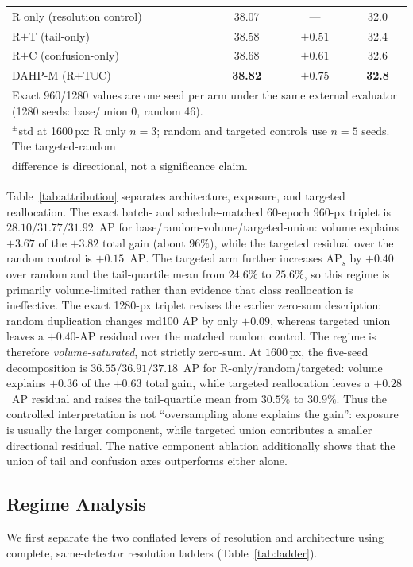 \documentclass[journal]{IEEEtran}
\newcommand{\ap}{\ensuremath{\mathrm{AP}}}
\newcommand{\aps}{\ensuremath{\mathrm{AP}_{s}}}
\newcommand{\dahpM}{DAHP-M}
\begin{document}
\begin{table}[!t]
{\begin{tabular}{lccc}
R only (resolution control) & 38.07 & --- & 32.0 \\
R$+$T (tail-only) & 38.58 & $+0.51$ & 32.4 \\
R$+$C (confusion-only) & 38.68 & $+0.61$ & 32.6 \\
\dahpM{} (R$+$T$\cup$C) & \textbf{38.82} & $+0.75$ & \textbf{32.8} \\
\bottomrule
\multicolumn{4}{l}{\footnotesize Exact 960/1280 values are one seed per arm under the same external evaluator (1280 seeds: base/union 0, random 46).}\\
\multicolumn{4}{l}{\footnotesize $^{\pm}$std at 1600\,px: R only $n{=}3$; random and targeted controls use $n{=}5$ seeds. The targeted-random}\\
\multicolumn{4}{l}{\footnotesize difference is directional, not a significance claim.}
\end{tabular}}
\end{table}
Table~\ref{tab:attribution} separates architecture, exposure, and targeted reallocation. The exact batch- and schedule-matched 60-epoch 960-px triplet is $28.10/31.77/31.92$~\ap{} for base/random-volume/targeted-union: volume explains $+3.67$ of the $+3.82$ total gain (about $96\%$), while the targeted residual over the random control is $+0.15$~\ap. The targeted arm further increases \aps{} by $+0.40$ over random and the tail-quartile mean from $24.6\%$ to $25.6\%$, so this regime is primarily volume-limited rather than evidence that class reallocation is ineffective. The exact 1280-px triplet revises the earlier zero-sum description: random duplication changes md100 \ap{} by only $+0.09$, whereas targeted union leaves a $+0.40$-\ap{} residual over the matched random control. The regime is therefore \emph{volume-saturated}, not strictly zero-sum. At $1600$\,px, the five-seed decomposition is $36.55/36.91/37.18$~\ap{} for R-only/random/targeted: volume explains $+0.36$ of the $+0.63$ total gain, while targeted reallocation leaves a $+0.28$~\ap{} residual and raises the tail-quartile mean from $30.5\%$ to $30.9\%$. Thus the controlled interpretation is not ``oversampling alone explains the gain'': exposure is usually the larger component, while targeted union contributes a smaller directional residual. The native component ablation additionally shows that the union of tail and confusion axes outperforms either alone.

\subsection{Regime Analysis}
\label{sec:regime}
We first separate the two conflated levers of resolution and architecture using complete, same-detector resolution ladders (Table~\ref{tab:ladder}).
\end{document}

